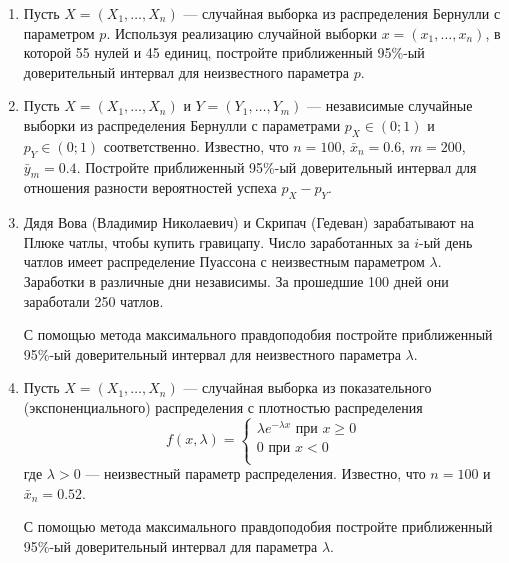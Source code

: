 \begin{enumerate}
\item Пусть $X = (X_{1}, \ldots, X_{n})$ — случайная выборка из распределения Бернулли с параметром $p$.
Используя реализацию случайной выборки $x = (x_{1}, \ldots, x_{n})$, в которой 55 нулей и 45 единиц,
постройте приближенный 95\%-ый доверительный интервал для неизвестного параметра $p$.

\item Пусть $X = (X_{1}, \ldots, X_{n})$ и $Y = (Y_{1}, \ldots, Y_{m})$ — независимые случайные
выборки из распределения Бернулли с параметрами $p_{X} \in (0;1)$ и $p_{Y} \in (0;1)$ соответственно.
Известно, что $n = 100$, $\bar{x}_{n} = 0.6$, $m = 200$, $\bar{y}_{m} = 0.4$.
Постройте приближенный 95\%-ый доверительный интервал для отношения разности вероятностей успеха $p_{X} - p_{Y}$.

\item Дядя Вова (Владимир Николаевич) и Скрипач (Гедеван) зарабатывают на Плюке чатлы,
чтобы купить гравицапу.
Число заработанных за $i$-ый день чатлов имеет распределение Пуассона с неизвестным параметром $\lambda$.
Заработки в различные дни независимы. За прошедшие 100 дней они заработали 250 чатлов.

С помощью метода максимального правдоподобия постройте приближенный 95\%-ый доверительный интервал для неизвестного параметра $\lambda$.

\item Пусть $X = (X_{1}, \ldots, X_{n})$ — случайная выборка из показательного (экспоненциального) распределения с плотностью распределения
\[
f(x,\lambda)=
\begin{cases}
\lambda e^{-\lambda x}\text{ при } x\geq 0 \\
0 \text{ при } x < 0 \\
\end{cases}
\]
где $\lambda > 0$ — неизвестный параметр распределения. Известно, что $n = 100$ и $\bar{x}_n = 0.52$.

С помощью метода максимального правдоподобия постройте приближенный 95\%-ый доверительный интервал для параметра $\lambda$.





\end{enumerate}
